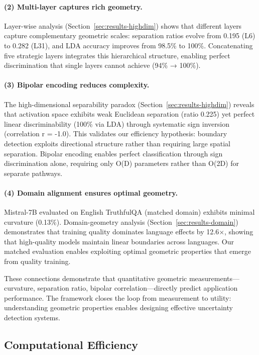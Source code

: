 \documentclass[11pt]{article}
\begin{document}
\paragraph{(2) Multi-layer captures rich geometry.} Layer-wise analysis (Section~\ref{sec:results-highdim}) shows that different layers capture complementary geometric scales: separation ratios evolve from 0.195 (L6) to 0.282 (L31), and LDA accuracy improves from 98.5\% to 100\%. Concatenating five strategic layers integrates this hierarchical structure, enabling perfect discrimination that single layers cannot achieve (94\% → 100\%).

\paragraph{(3) Bipolar encoding reduces complexity.} The high-dimensional separability paradox (Section~\ref{sec:results-highdim}) reveals that activation space exhibits weak Euclidean separation (ratio 0.225) yet perfect linear discriminability (100\% via LDA) through systematic sign inversion (correlation r = -1.0). This validates our efficiency hypothesis: boundary detection exploits directional structure rather than requiring large spatial separation. Bipolar encoding enables perfect classification through sign discrimination alone, requiring only O(D) parameters rather than O(2D) for separate pathways.

\paragraph{(4) Domain alignment ensures optimal geometry.} Mistral-7B evaluated on English TruthfulQA (matched domain) exhibits minimal curvature (0.13\%). Domain-geometry analysis (Section~\ref{sec:results-domain}) demonstrates that training quality dominates language effects by 12.6×, showing that high-quality models maintain linear boundaries across languages. Our matched evaluation enables exploiting optimal geometric properties that emerge from quality training.

These connections demonstrate that quantitative geometric measurements—curvature, separation ratio, bipolar correlation—directly predict application performance. The framework closes the loop from measurement to utility: understanding geometric properties enables designing effective uncertainty detection systems.\subsection{Computational Efficiency}
\end{document}
